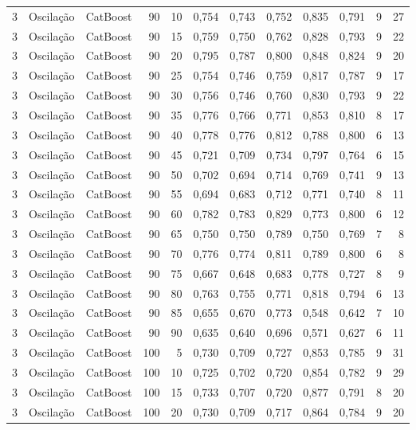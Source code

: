 \begin{longtable}{@{}rllrrrrrrrrr@{}}
3 & Oscilação & CatBoost & 90 & 10 & 0,754 & 0,743 & 0,752 & 0,835 & 0,791 & 9 & 27 \\
3 & Oscilação & CatBoost & 90 & 15 & 0,759 & 0,750 & 0,762 & 0,828 & 0,793 & 9 & 22 \\
3 & Oscilação & CatBoost & 90 & 20 & 0,795 & 0,787 & 0,800 & 0,848 & 0,824 & 9 & 20 \\
3 & Oscilação & CatBoost & 90 & 25 & 0,754 & 0,746 & 0,759 & 0,817 & 0,787 & 9 & 17 \\
3 & Oscilação & CatBoost & 90 & 30 & 0,756 & 0,746 & 0,760 & 0,830 & 0,793 & 9 & 22 \\
3 & Oscilação & CatBoost & 90 & 35 & 0,776 & 0,766 & 0,771 & 0,853 & 0,810 & 8 & 17 \\
3 & Oscilação & CatBoost & 90 & 40 & 0,778 & 0,776 & 0,812 & 0,788 & 0,800 & 6 & 13 \\
3 & Oscilação & CatBoost & 90 & 45 & 0,721 & 0,709 & 0,734 & 0,797 & 0,764 & 6 & 15 \\
3 & Oscilação & CatBoost & 90 & 50 & 0,702 & 0,694 & 0,714 & 0,769 & 0,741 & 9 & 13 \\
3 & Oscilação & CatBoost & 90 & 55 & 0,694 & 0,683 & 0,712 & 0,771 & 0,740 & 8 & 11 \\
3 & Oscilação & CatBoost & 90 & 60 & 0,782 & 0,783 & 0,829 & 0,773 & 0,800 & 6 & 12 \\
3 & Oscilação & CatBoost & 90 & 65 & 0,750 & 0,750 & 0,789 & 0,750 & 0,769 & 7 & 8 \\
3 & Oscilação & CatBoost & 90 & 70 & 0,776 & 0,774 & 0,811 & 0,789 & 0,800 & 6 & 8 \\
3 & Oscilação & CatBoost & 90 & 75 & 0,667 & 0,648 & 0,683 & 0,778 & 0,727 & 8 & 9 \\
3 & Oscilação & CatBoost & 90 & 80 & 0,763 & 0,755 & 0,771 & 0,818 & 0,794 & 6 & 13 \\
3 & Oscilação & CatBoost & 90 & 85 & 0,655 & 0,670 & 0,773 & 0,548 & 0,642 & 7 & 10 \\
3 & Oscilação & CatBoost & 90 & 90 & 0,635 & 0,640 & 0,696 & 0,571 & 0,627 & 6 & 11 \\
3 & Oscilação & CatBoost & 100 & 5 & 0,730 & 0,709 & 0,727 & 0,853 & 0,785 & 9 & 31 \\
3 & Oscilação & CatBoost & 100 & 10 & 0,725 & 0,702 & 0,720 & 0,854 & 0,782 & 9 & 29 \\
3 & Oscilação & CatBoost & 100 & 15 & 0,733 & 0,707 & 0,720 & 0,877 & 0,791 & 8 & 20 \\
3 & Oscilação & CatBoost & 100 & 20 & 0,730 & 0,709 & 0,717 & 0,864 & 0,784 & 9 & 20 \\

\end{longtable}

